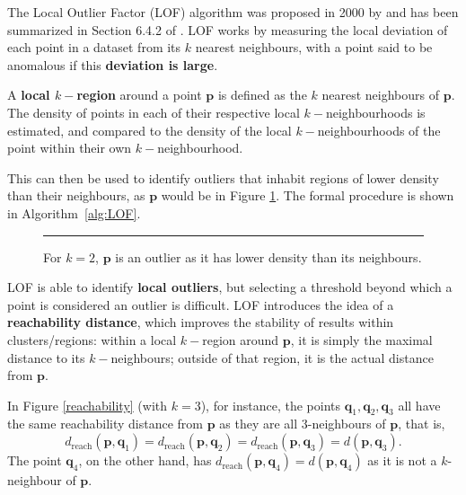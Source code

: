 The Local Outlier Factor (LOF) algorithm was proposed in 2000 by \cite{LOF} and has been summarized in Section 6.4.2 of \cite{A10}. LOF works by measuring the local deviation of each point in a dataset from its $k$ nearest neighbours, with a point said to be anomalous if this \textbf{deviation is large}.

A \textbf{local $k-$region} around a point $\mathbf{p}$ is defined as the $k$ nearest neighbours of $\mathbf{p}$. The density of points in each of their respective local $k-$neighbourhoods is estimated, and compared to the density of the local $k-$neighbourhoods of the point within their own $k-$neighbourhood.

This can then be used to identify outliers that inhabit regions of lower density than their neighbours,
as $\mathbf{p}$ would be in Figure \ref{lofoutlier}. The formal procedure is shown in Algorithm~\ref{alg:LOF}. 

\begin{figure}[H]
\hrule \vspace{0.4cm}
\centering
{}
\caption{For $k=2$, $\mathbf{p}$ is an outlier as it has lower density than its neighbours.}
\label{lofoutlier}
\end{figure}
\noindent LOF is able to identify \textbf{local outliers}, but selecting a threshold beyond which a point is considered an outlier is difficult. \newl LOF introduces the idea of a \textbf{reachability distance}, which improves the stability of results within clusters/regions: within a local $k-$region around $\mathbf{p}$, it is simply the maximal distance to its $k-$neighbours; outside of that region, it is the actual distance from $\mathbf{p}$. 
\par In Figure \ref{reachability} (with $k=3$), for instance, the points $\mathbf{q}_1, \mathbf{q}_2, \mathbf{q}_3$ all have the same reachability distance from $\mathbf{p}$ as they are all $3$-neighbours of $\mathbf{p}$, that is, 
$$
d_{\text{reach}}(\mathbf{p}, \mathbf{q}_1) 
= d_{\text{reach}}(\mathbf{p}, \mathbf{q}_2)
= d_{\text{reach}}(\mathbf{p}, \mathbf{q}_3)
= d(\mathbf{p}, \mathbf{q}_3)
.$$
The point $\mathbf{q}_4$, on the other hand, has 
$d_{\text{reach}}(\mathbf{p}, \mathbf{q}_4)
= d(\mathbf{p}, \mathbf{q}_4)
$
as it is not a $k$-neighbour of $\mathbf{p}$.

